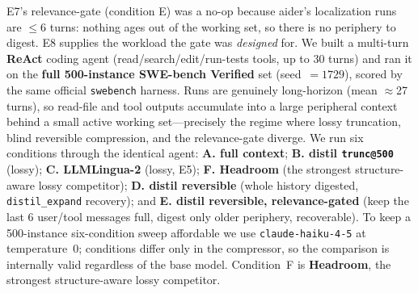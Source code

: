 \documentclass{article}
\newcommand{\sweEeightN}{500}\newcommand{\sweEeightSeed}{1729}%
\begin{document}
E7's relevance-gate (condition E) was a no-op because aider's localization runs are
$\le$6 turns: nothing ages out of the working set, so there is no periphery to digest.
E8 supplies the workload the gate was \emph{designed} for. We built a multi-turn
\textbf{ReAct} coding agent (read/search/edit/run-tests tools, up to 30 turns) and ran it
on the \textbf{full \sweEeightN{}-instance SWE-bench Verified} set (seed~$=\sweEeightSeed{}$),
scored by the same official \texttt{swebench} harness. Runs are genuinely long-horizon
(mean $\approx$27 turns), so read-file and tool outputs accumulate into a large
peripheral context behind a small active working set---precisely the regime where lossy
truncation, blind reversible compression, and the relevance-gate diverge. We run six
conditions through the identical agent: \textbf{A. full context}; \textbf{B. distil
\texttt{trunc@500}} (lossy); \textbf{C. LLMLingua-2} (lossy, E5); \textbf{F. Headroom} (the
strongest structure-aware lossy competitor); \textbf{D. distil reversible} (whole history digested,
\texttt{distil\_expand} recovery); and \textbf{E. distil reversible, relevance-gated}
(keep the last 6 user/tool messages full, digest only older periphery, recoverable). To
keep a \sweEeightN{}-instance six-condition sweep affordable we use
\texttt{claude-haiku-4-5} at temperature~0; conditions differ only in the compressor, so
the comparison is internally valid regardless of the base model. Condition~F is
\textbf{Headroom}, the strongest structure-aware lossy competitor.
\end{document}
